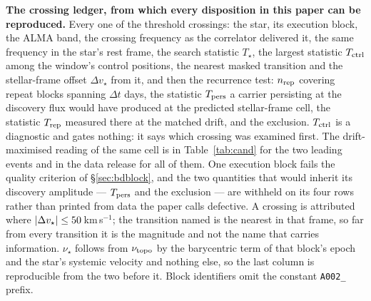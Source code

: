 \begin{table}
\centering
\caption{\textbf{The crossing ledger, from which every disposition in this
paper can be reproduced.} Every one of the \NCross{} threshold crossings:
the star, its execution block, the ALMA band, the crossing frequency as the
correlator delivered it, the same frequency in the star's rest frame, the
search statistic $T_\star$, the largest statistic $T_{\rm ctrl}$ among the
window's \NCtrl{} control positions, the nearest masked transition and the
stellar-frame offset $\Delta v_\star$ from it, and then the recurrence
test: $n_{\rm rep}$ covering repeat blocks spanning $\Delta t$ days, the
statistic $T_{\rm pers}$ a carrier persisting at the discovery flux would
have produced at the predicted stellar-frame cell, the statistic
$T_{\rm rep}$ measured there at the matched drift, and the exclusion.
$T_{\rm ctrl}$ is a diagnostic and gates nothing: it says which crossing was
examined first. The drift-maximised reading of the same cell is in
Table~\ref{tab:cand} for the two leading events and in the data release for
all of them. One execution block fails the quality criterion of
\S\ref{sec:bdblock}, and the two quantities that would inherit its
discovery amplitude --- $T_{\rm pers}$ and the exclusion --- are withheld
on its four rows rather than printed from data the paper calls defective.
A crossing is attributed where $|\Delta v_\star|\le\MaskHalfKms$\,km\,s$^{-1}$;
the transition named is the nearest in that frame, so far from every
transition it is the magnitude and not the name that carries information.
$\nu_\star$ follows from $\nu_{\rm topo}$ by the barycentric term of that
block's epoch and the star's systemic velocity and nothing else, so the last
column is reproducible from the two before it. Block identifiers omit the
constant \texttt{A002\_} prefix.}
\label{tab:ledger}
\tiny

\end{table}

